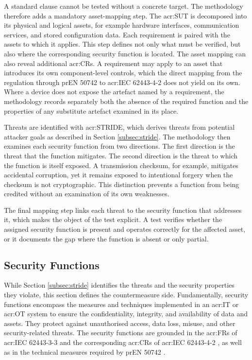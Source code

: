 A standard clause cannot be tested without a concrete target. The methodology therefore adds a mandatory asset-mapping step. The \gls{acr:SUT} is decomposed into its physical and logical assets, for example hardware interfaces, communication services, and stored configuration data. Each requirement is paired with the assets to which it applies. This step defines not only what must be verified, but also where the corresponding security function is located. The asset mapping can also reveal additional \glspl{acr:CR}. A requirement may apply to an asset that introduces its own component-level controls, which the direct mapping from the regulation through prEN 50742 to \gls{acr:IEC} 62443-4-2 does not yield on its own. Where a device does not expose the artefact named by a requirement, the methodology records separately both the absence of the required function and the properties of any substitute artefact examined in its place. 

Threats are identified with \gls{acr:STRIDE}, which derives threats from potential attacker goals as described in Section \ref{subsec:stride}. The methodology then examines each security function from two directions. The first direction is the threat that the function mitigates. The second direction is the threat to which the function is itself exposed. A transmission checksum, for example, mitigates accidental corruption, yet it remains exposed to intentional forgery when the checksum is not cryptographic. This distinction prevents a function from being credited without an examination of its own weaknesses. 

The final mapping step links each threat to the security function that addresses it, which makes the object of the test explicit. A test verifies whether the assigned security function is present and operates correctly for the affected asset, or it documents the gap where the function is absent or only partial. 

\subsection{Security Functions} 
\label{subsec:security_functions} 

While Section \ref{subsec:stride} identifies the threats and the security properties they violate, this section defines the countermeasure side. Fundamentally, security functions encompass the measures and techniques implemented in an \gls{acr:IT} or \gls{acr:OT} system to ensure the confidentiality, integrity, and availability of data and assets. They protect against unauthorised access, data loss, misuse, and other security-related threats. The security functions are grounded in the \glspl{acr:FR} of \gls{acr:IEC} 62443-3-3 and the corresponding \glspl{acr:CR} of \gls{acr:IEC} 62443-4-2 \cite[p. 15]{IEC62443-3-3} \cite[p. 18]{IEC62443-4-2}, as well as in the technical measures required by prEN 50742 \cite[p. 17]{prEN50742_2025}.

